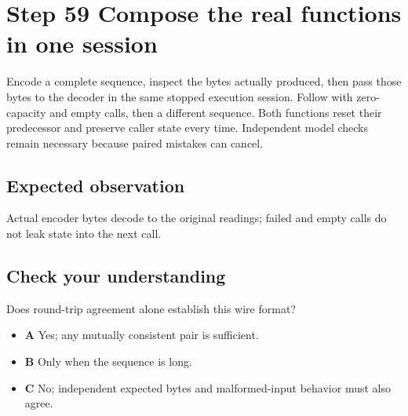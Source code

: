 \section{Step 59 Compose the real functions in one session}\label{delta-s59}

Encode a complete sequence, inspect the bytes actually produced, then pass those bytes to the decoder in the same stopped execution session. Follow with zero-capacity and empty calls, then a different sequence. Both functions reset their predecessor and preserve caller state every time. Independent model checks remain necessary because paired mistakes can cancel.

\subsection{Expected observation}
Actual encoder bytes decode to the original readings; failed and empty calls do not leak state into the next call.

\subsection{Check your understanding}
Does round-trip agreement alone establish this wire format?

\begin{itemize}
  \item \textbf{A} Yes; any mutually consistent pair is sufficient.
  \item \textbf{B} Only when the sequence is long.
  \item \textbf{C} No; independent expected bytes and malformed-input behavior must also agree.
\end{itemize}
